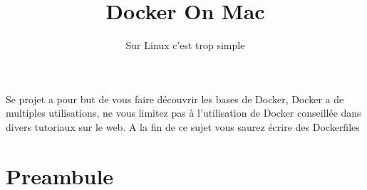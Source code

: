 \documentclass{42}
\begin{document}
\title{Docker On Mac}
\subtitle{Sur Linux c'est trop simple}


\summary
{
Se projet a pour but de vous faire découvrir les bases de Docker, Docker a de multiples utilisations, ne vous limitez pas à l’utilisation de Docker conseillée dans divers tutoriaux sur le web.
A la fin de ce sujet vous saurez écrire des Dockerfiles
}

\maketitle

\tableofcontents

\chapter{Preambule}
\end{document}
